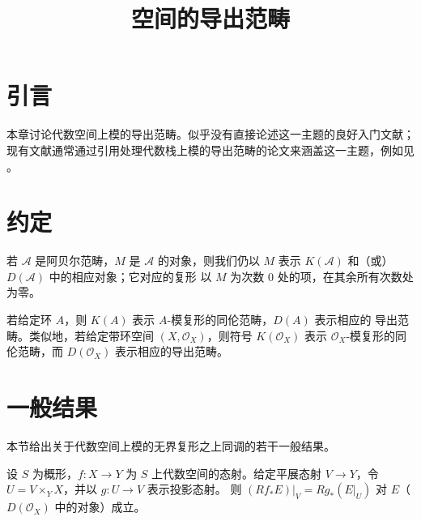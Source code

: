 

%


\title{空间的导出范畴}


\maketitle

\label{section-phantom}

\tableofcontents

\section{引言}
\label{section-introduction}

\noindent
本章讨论代数空间上模的导出范畴。似乎没有直接论述这一主题的良好入门文献；
现有文献通常通过引用处理代数栈上模的导出范畴的论文来涵盖这一主题，例如见
\cite{olsson_sheaves}。



\section{约定}
\label{section-conventions}

\noindent
若 $\mathcal{A}$ 是阿贝尔范畴，$M$ 是 $\mathcal{A}$ 的对象，则我们仍以
$M$ 表示 $K(\mathcal{A})$ 和（或）$D(\mathcal{A})$ 中的相应对象；它对应的复形
以 $M$ 为次数 $0$ 处的项，在其余所有次数处为零。

\medskip\noindent
若给定环 $A$，则 $K(A)$ 表示 $A$-模复形的同伦范畴，$D(A)$ 表示相应的
导出范畴。类似地，若给定带环空间 $(X, \mathcal{O}_X)$，则符号
$K(\mathcal{O}_X)$ 表示 $\mathcal{O}_X$-模复形的同伦范畴，而
$D(\mathcal{O}_X)$ 表示相应的导出范畴。





\section{一般结果}
\label{section-generalities}

\noindent
本节给出关于代数空间上模的无界复形之上同调的若干一般结果。

\begin{lemma}
\label{lemma-restrict-direct-image-open}
设 $S$ 为概形，$f : X \to Y$ 为 $S$ 上代数空间的态射。给定平展态射
$V \to Y$，令 $U = V \times_Y X$，并以 $g : U \to V$ 表示投影态射。
则 $(Rf_*E)|_V = Rg_*(E|_U)$ 对 $E$（$D(\mathcal{O}_X)$ 中的对象）成立。
\end{lemma}

